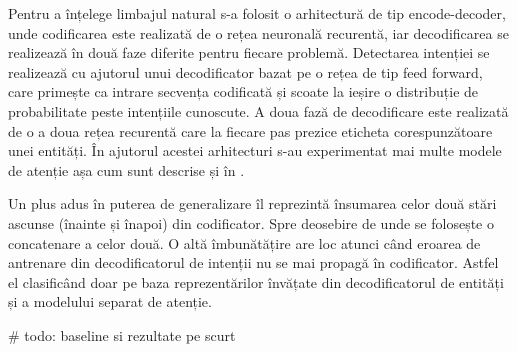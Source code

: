 Pentru a înțelege limbajul natural s-a folosit o arhitectură de tip encode-decoder, unde codificarea este realizată de o rețea neuronală recurentă, iar decodificarea se realizează în două faze diferite pentru fiecare problemă. Detectarea intenției se realizează cu ajutorul unui decodificator bazat pe o rețea de tip feed forward, care primește ca intrare secvența codificată și scoate la ieșire o distribuție de probabilitate peste intențiile cunoscute. A doua fază de decodificare este realizată de o a doua rețea recurentă care la fiecare pas prezice eticheta corespunzătoare unei entități. În ajutorul acestei arhitecturi s-au experimentat mai multe modele de atenție așa cum sunt descrise și în \cite{trans_luong_manning}.

Un plus adus în puterea de generalizare îl reprezintă însumarea celor două stări ascunse (înainte și înapoi) din codificator. Spre deosebire de \cite{att_joint_bing} unde se folosește o concatenare a celor două. O altă îmbunătățire are loc atunci când eroarea de antrenare din decodificatorul de intenții nu se mai propagă în codificator. Astfel el clasificând doar pe baza reprezentărilor învățate din decodificatorul de entități și a modelului separat de atenție.

\# todo: baseline si rezultate pe scurt



